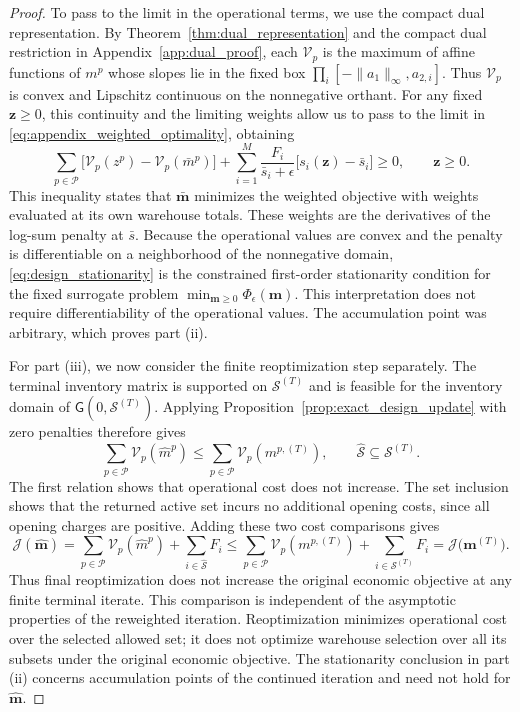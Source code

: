 \documentclass[a4paper,fleqn]{cas-sc}
\theoremstyle{remark}
\theoremstyle{plain}
\begin{document}
\begin{proof}
To pass to the limit in the operational terms, we use the compact dual representation. By Theorem~\ref{thm:dual_representation} and the compact dual restriction in Appendix~\ref{app:dual_proof}, each $\mathcal V_p$ is the maximum of affine functions of $m^p$ whose slopes lie in the fixed box $\prod_i[-\|a_1\|_\infty,a_{2,i}]$. Thus $\mathcal V_p$ is convex and Lipschitz continuous on the nonnegative orthant. For any fixed $\mathbf z\ge0$, this continuity and the limiting weights allow us to pass to the limit in \eqref{eq:appendix_weighted_optimality}, obtaining
\begin{equation}\label{eq:design_stationarity}
    \sum_{p\in\mathcal P}\bigl[\mathcal V_p(z^p)-\mathcal V_p(\bar m^p)\bigr]+\sum_{i=1}^M\frac{F_i}{\bar s_i+\epsilon}\bigl[s_i(\mathbf z)-\bar s_i\bigr]\ge0,\qquad\mathbf z\ge0.
\end{equation}
This inequality states that $\bar{\mathbf m}$ minimizes the weighted objective with weights evaluated at its own warehouse totals. These weights are the derivatives of the log-sum penalty at $\bar s$. Because the operational values are convex and the penalty is differentiable on a neighborhood of the nonnegative domain, \eqref{eq:design_stationarity} is the constrained first-order stationarity condition for the fixed surrogate problem $\min_{\mathbf m\ge0}\Phi_\epsilon(\mathbf m)$. This interpretation does not require differentiability of the operational values. The accumulation point was arbitrary, which proves part (ii).

For part (iii), we now consider the finite reoptimization step separately. The terminal inventory matrix is supported on $\mathcal S^{(T)}$ and is feasible for the inventory domain of $\mathsf G(0,\mathcal S^{(T)})$. Applying Proposition~\ref{prop:exact_design_update} with zero penalties therefore gives
\[
    \sum_{p\in\mathcal P}\mathcal V_p(\hat m^p)\le\sum_{p\in\mathcal P}\mathcal V_p(m^{p,(T)}),\qquad\widehat{\mathcal S}\subseteq\mathcal S^{(T)}.
\]
The first relation shows that operational cost does not increase. The set inclusion shows that the returned active set incurs no additional opening costs, since all opening charges are positive. Adding these two cost comparisons gives
\[
    \mathcal J(\hat{\mathbf m})=\sum_{p\in\mathcal P}\mathcal V_p(\hat m^p)+\sum_{i\in\widehat{\mathcal S}}F_i\le\sum_{p\in\mathcal P}\mathcal V_p(m^{p,(T)})+\sum_{i\in\mathcal S^{(T)}}F_i=\mathcal J\bigl(\mathbf m^{(T)}\bigr).
\]
Thus final reoptimization does not increase the original economic objective at any finite terminal iterate. This comparison is independent of the asymptotic properties of the reweighted iteration. Reoptimization minimizes operational cost over the selected allowed set; it does not optimize warehouse selection over all its subsets under the original economic objective. The stationarity conclusion in part (ii) concerns accumulation points of the continued iteration and need not hold for $\hat{\mathbf m}$.
\end{proof}
\end{document}
